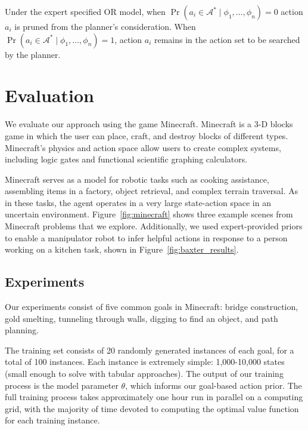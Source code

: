 \documentclass[11pt]{article}
\begin{document}
Under the expert specified OR model, when $\Pr(a_i \in \mathcal{A}^*  \mid \phi_1, \ldots, \phi_n) = 0$
action $a_i$ is pruned from the planner's consideration. When
$\Pr(a_i \in \mathcal{A}^*  \mid \phi_1, \ldots, \phi_n) = 1$,
action $a_i$ remains in the action set to be searched by the planner.




\section{Evaluation}
\label{sec:evaluation}

We evaluate our approach using the game Minecraft. Minecraft is a 3-D blocks game in which the
user can place, craft, and destroy blocks of different types.
Minecraft's physics and action space allow users to create complex
systems, including logic gates and functional scientific graphing
calculators.

Minecraft serves as a model for robotic tasks such as cooking
assistance, assembling items in a factory, object retrieval, and
complex terrain traversal.  As in these tasks, the agent operates in a
very large state-action space in an uncertain environment.
Figure~\ref{fig:minecraft} shows three example scenes from Minecraft
problems that we explore.  Additionally, we used expert-provided priors to
enable a manipulator robot to infer helpful actions in response to a
person working on a kitchen task, shown in Figure~\ref{fig:baxter_results}.


\subsection{Experiments}

Our experiments consist of five common goals in Minecraft:
bridge construction, gold smelting, tunneling through
walls, digging to find an object, and path planning.

The training set consists of 20 randomly generated instances of each goal, for a total of 100 instances. Each instance is extremely simple: 1,000-10,000 states (small enough to solve with tabular approaches). The output of our training process is the model parameter $\theta$, which informs our goal-based action prior. The full training process takes approximately one hour run in parallel on a computing grid, with the majority of time devoted to computing the optimal value function for each training instance.
\end{document}
